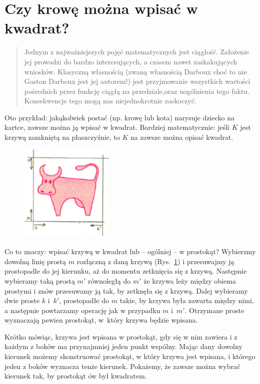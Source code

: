 \documentclass[a4paper,12pt]{article}
\begin{document}
\pagestyle{empty}

\section*{Czy krowę można wpisać w kwadrat?}

\begin{abstract}
Jednym z najważniejszych pojęć matematycznych jest ciągłość.
Założenie jej prowadzi do bardzo interesujących,
a czasem nawet zaskakujących wniosków.
Klasyczną własnością (zwaną własnością Darboux choć to
nie Gaston Darboux jest jej autorem!)
jest przyjmowanie wszystkich wartości pośrednich przez
funkcję ciągłą na przedziale,oraz uogólnienia tego faktu.
Konsekwencje tego mogą nas niejednokrotnie zaskoczyć.
\end{abstract}

Oto przykład: jakąkolwiek postać (np. krowę lub kota)
narysuje dziecko na kartce, zawsze można ją wpisać w kwadrat.
Bardziej matematycznie: jeśli $K$ jest krzywą zamkniętą 
na płaszczyźnie, to $K$ na zawsze można opisać kwadrat.

\begin{figure}
\includegraphics[width=4.5cm]{krowa-1}
\vspace{-20pt}
\label{krowa}
\end{figure}

Co to znaczy: wpisać krzywą w kwadrat lub – ogólniej – w prostokąt?
Wybierzmy dowolną linię prostą $m$ rozłączną z daną krzywą (Rys.~\ref{krowa}) 
i przesuwajmy ją prostopadle do jej kierunku,
aż do momentu zetknięcia się z krzywą.
Następnie wybieramy taką prostą $m'$ równoległą do $m'$   
że krzywa leży między obiema prostymi i znów przesuwamy ją tak,
by zetknęła się z krzywą. Dalej wybieramy dwie proste $k$
i~$k'$, prostopadłe do $m$ takie, by krzywa była zawarta między nimi,
a następnie powtarzamy operację jak w przypadku
$m$ i~$m'$. Otrzymane proste wyznaczają pewien prostokąt, 
w~który krzywa będzie wpisana.

Krótko mówiąc, krzywa jest wpisana w prostokąt,
gdy się w nim zawiera i z każdym z boków ma przynajmniej
jeden punkt wspólny. Mając dany dowolny kierunek
możemy skonstruować prostokąt, w który krzywa
jest wpisana, i którego jeden z boków wyznacza 
tenże kierunek. Pokażemy, że zawsze można wybrać
kierunek tak, by prostokąt ów był kwadratem. 
\end{document}
